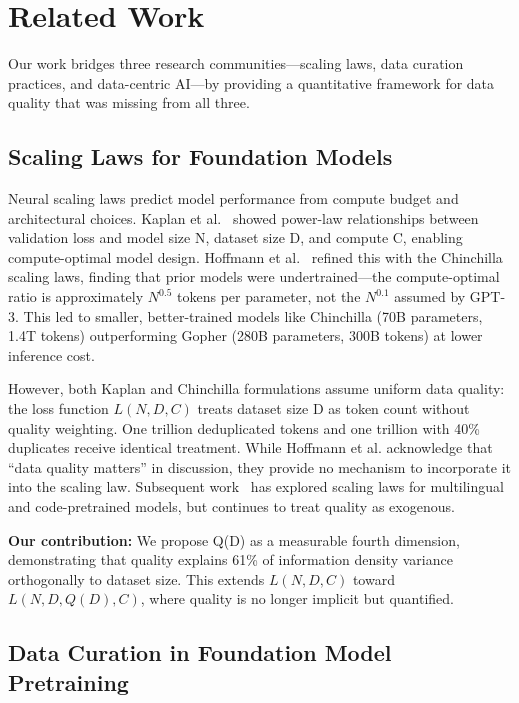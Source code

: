 \section{Related Work}

Our work bridges three research communities---scaling laws, data curation practices, and data-centric AI---by providing a quantitative framework for data quality that was missing from all three.

\subsection{Scaling Laws for Foundation Models}

Neural scaling laws predict model performance from compute budget and architectural choices. Kaplan et al.~\cite{kaplan2020scaling} showed power-law relationships between validation loss and model size N, dataset size D, and compute C, enabling compute-optimal model design. Hoffmann et al.~\cite{hoffmann2022training} refined this with the Chinchilla scaling laws, finding that prior models were undertrained---the compute-optimal ratio is approximately $N^{0.5}$ tokens per parameter, not the $N^{0.1}$ assumed by GPT-3. This led to smaller, better-trained models like Chinchilla (70B parameters, 1.4T tokens) outperforming Gopher (280B parameters, 300B tokens) at lower inference cost.

However, both Kaplan and Chinchilla formulations assume uniform data quality: the loss function $L(N, D, C)$ treats dataset size D as token count without quality weighting. One trillion deduplicated tokens and one trillion with 40\% duplicates receive identical treatment. While Hoffmann et al. acknowledge that ``data quality matters'' in discussion, they provide no mechanism to incorporate it into the scaling law. Subsequent work~\cite{muennighoff2023scaling,bi2024deepseek} has explored scaling laws for multilingual and code-pretrained models, but continues to treat quality as exogenous.

\textbf{Our contribution:} We propose Q(D) as a measurable fourth dimension, demonstrating that quality explains 61\% of information density variance orthogonally to dataset size. This extends $L(N, D, C)$ toward $L(N, D, Q(D), C)$, where quality is no longer implicit but quantified.

\subsection{Data Curation in Foundation Model Pretraining}

